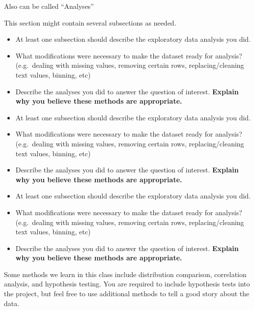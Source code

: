 \documentclass[
  letterpaper,
  DIV=11,
  numbers=noendperiod]{scrreprt}
\begin{document}
\begin{tcolorbox}[enhanced jigsaw, bottomrule=.15mm, left=2mm, bottomtitle=1mm, leftrule=.75mm, coltitle=black, toprule=.15mm, breakable, opacitybacktitle=0.6, titlerule=0mm, colback=white, colbacktitle=quarto-callout-note-color!10!white, toptitle=1mm, arc=.35mm, rightrule=.15mm, colframe=quarto-callout-note-color-frame, opacityback=0, title=\textcolor{quarto-callout-note-color}{\faInfo}\hspace{0.5em}{From the report requirements}]

Also can be called ``Analyses''

This section might contain several subsections as needed.

\begin{itemize}
\item
  At least one subsection should describe the exploratory data analysis
  you did.
\item
  What modifications were necessary to make the dataset ready for
  analysis? (e.g.~dealing with missing values, removing certain rows,
  replacing/cleaning text values, binning, etc)
\item
  Describe the analyses you did to answer the question of interest.
  \textbf{Explain why you believe these methods are appropriate.}
\item
  At least one subsection should describe the exploratory data analysis
  you did.
\item
  What modifications were necessary to make the dataset ready for
  analysis? (e.g.~dealing with missing values, removing certain rows,
  replacing/cleaning text values, binning, etc)
\item
  Describe the analyses you did to answer the question of interest.
  \textbf{Explain why you believe these methods are appropriate.}
\item
  At least one subsection should describe the exploratory data analysis
  you did.
\item
  What modifications were necessary to make the dataset ready for
  analysis? (e.g.~dealing with missing values, removing certain rows,
  replacing/cleaning text values, binning, etc)
\item
  Describe the analyses you did to answer the question of interest.
  \textbf{Explain why you believe these methods are appropriate.}
\end{itemize}

Some methods we learn in this class include distribution comparison,
correlation analysis, and hypothesis testing. You are required to
include hypothesis tests into the project, but feel free to use
additional methods to tell a good story about the data.

\end{tcolorbox}
\end{document}
